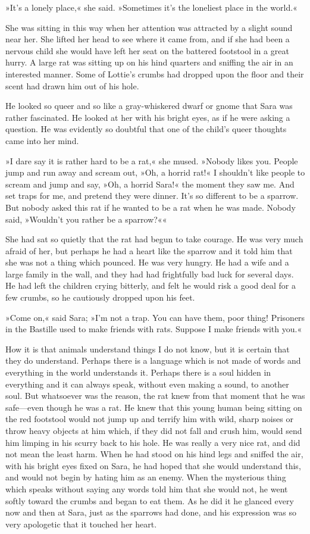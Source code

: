 »It's a lonely place,« she said. »Sometimes it's the loneliest place in the world.«

She was sitting in this way when her attention was attracted by a slight sound near her. She lifted her head to see where it came from, and if she had been a nervous child she would have left her seat on the battered footstool in a great hurry. A large rat was sitting up on his hind quarters and sniffing the air in an interested manner. Some of Lottie's crumbs had dropped upon the floor and their scent had drawn him out of his hole.

He looked so queer and so like a gray-whiskered dwarf or gnome that Sara was rather fascinated. He looked at her with his bright eyes, as if he were asking a question. He was evidently so doubtful that one of the child's queer thoughts came into her mind.

»I dare say it is rather hard to be a rat,« she mused. »Nobody likes you. People jump and run away and scream out, »Oh, a horrid rat!« I shouldn't like people to scream and jump and say, »Oh, a horrid Sara!« the moment they saw me. And set traps for me, and pretend they were dinner. It's so different to be a sparrow. But nobody asked this rat if he wanted to be a rat when he was made. Nobody said, »Wouldn't you rather be a sparrow?««

She had sat so quietly that the rat had begun to take courage. He was very much afraid of her, but perhaps he had a heart like the sparrow and it told him that she was not a thing which pounced. He was very hungry. He had a wife and a large family in the wall, and they had had frightfully bad luck for several days. He had left the children crying bitterly, and felt he would risk a good deal for a few crumbs, so he cautiously dropped upon his feet.

»Come on,« said Sara; »I'm not a trap. You can have them, poor thing! Prisoners in the Bastille used to make friends with rats. Suppose I make friends with you.«

How it is that animals understand things I do not know, but it is certain that they do understand. Perhaps there is a language which is not made of words and everything in the world understands it. Perhaps there is a soul hidden in everything and it can always speak, without even making a sound, to another soul. But whatsoever was the reason, the rat knew from that moment that he was safe—even though he was a rat. He knew that this young human being sitting on the red footstool would not jump up and terrify him with wild, sharp noises or throw heavy objects at him which, if they did not fall and crush him, would send him limping in his scurry back to his hole. He was really a very nice rat, and did not mean the least harm. When he had stood on his hind legs and sniffed the air, with his bright eyes fixed on Sara, he had hoped that she would understand this, and would not begin by hating him as an enemy. When the mysterious thing which speaks without saying any words told him that she would not, he went softly toward the crumbs and began to eat them. As he did it he glanced every now and then at Sara, just as the sparrows had done, and his expression was so very apologetic that it touched her heart.

